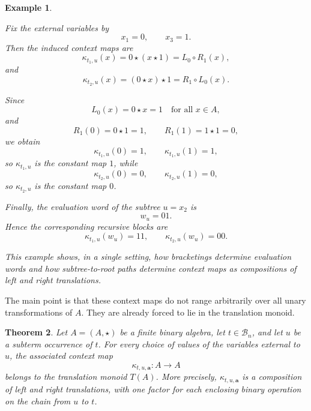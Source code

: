 \documentclass[11pt]{article}
\newtheorem{theorem}{Theorem}[section]
\newtheorem{example}[theorem]{Example}
\begin{document}
\begin{example}
\begin{center}
\begin{tikzpicture}[
  baseline=(current bounding box.center),
  op/.style={circle,draw,inner sep=1.2pt},
  leaf/.style={inner sep=1pt},
  marked/.style={draw,rounded corners,fill=blue!12,inner sep=2pt}
]
\end{tikzpicture}
\end{center}

Fix the external variables by
\[
x_1=0,
\qquad
x_3=1.
\]
Then the induced context maps are
\[
\kappa_{t_1,u}(x)=0\star(x\star 1)=L_0\circ R_1(x),
\]
and
\[
\kappa_{t_2,u}(x)=(0\star x)\star 1=R_1\circ L_0(x).
\]

Since
\[
L_0(x)=0\star x=1
\quad\text{for all }x\in A,
\]
and
\[
R_1(0)=0\star 1=1,\qquad R_1(1)=1\star 1=0,
\]
we obtain
\[
\kappa_{t_1,u}(0)=1,\qquad \kappa_{t_1,u}(1)=1,
\]
so \(\kappa_{t_1,u}\) is the constant map \(1\), while
\[
\kappa_{t_2,u}(0)=0,\qquad \kappa_{t_2,u}(1)=0,
\]
so \(\kappa_{t_2,u}\) is the constant map \(0\).

Finally, the evaluation word of the subtree \(u=x_2\) is
\[
w_u=01.
\]
Hence the corresponding recursive blocks are
\[
\kappa_{t_1,u}(w_u)=11,
\qquad
\kappa_{t_2,u}(w_u)=00.
\]

This example shows, in a single setting, how bracketings determine evaluation
words and how subtree-to-root paths determine context maps as compositions of
left and right translations.
\end{example}


The main point is that these context maps do not range arbitrarily over all
unary transformations of \(A\). They are already forced to lie in the
translation monoid.


\begin{theorem}\label{thm:context-in-translation-monoid}
Let \(A=(A,\star)\) be a finite binary algebra, let \(t\in \mathcal B_n\), and
let \(u\) be a subterm occurrence of \(t\). For every choice of values of the
variables external to \(u\), the associated context map
\[
\kappa_{t,u,\mathbf a}:A\to A
\]
belongs to the translation monoid \(T(A)\). More precisely,
\(\kappa_{t,u,\mathbf a}\) is a composition of left and right translations,
with one factor for each enclosing binary operation on the chain from \(u\) to
\(t\).
\end{theorem}
\end{document}
